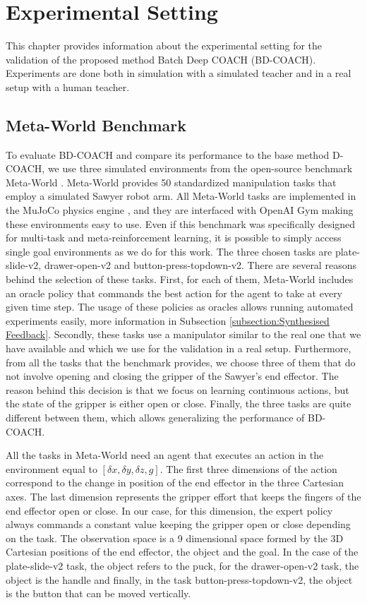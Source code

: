 \chapter{Experimental Setting}
\label{chapter:Experimental Setting}

This chapter provides information about the experimental setting for the validation of the proposed method Batch Deep COACH (BD-COACH). Experiments are done both in simulation with a simulated teacher and in a real setup with a human teacher.


\section{Meta-World Benchmark}
\label{section:Meta-World Benchmark}
To evaluate BD-COACH and compare its performance to the base method D-COACH, we use three simulated environments from the open-source benchmark Meta-World \cite{metaworld}. Meta-World 
provides 50 standardized manipulation tasks that employ a simulated Sawyer robot arm. All Meta-World tasks are implemented in the MuJoCo physics engine \cite{mujoco}, and they are interfaced with OpenAI Gym \cite{openai} making these environments easy to use. Even if this benchmark was specifically designed for multi-task and meta-reinforcement learning, it is possible to simply access single goal environments as we do for this work. 
The three chosen tasks are plate-slide-v2, drawer-open-v2 and button-press-topdown-v2. There are several reasons behind the selection of these tasks. First, for each of them, Meta-World includes an oracle policy that commands the best action for the agent to take at every given time step. The usage of these policies as oracles allows running automated experiments easily, more information in Subsection \ref{subsection:Synthesised Feedback}. Secondly, these tasks use a manipulator similar to the real one that we have available and which we use for the validation in a real setup. Furthermore, from all the tasks that the benchmark provides, we choose three of them that do not involve opening and closing the gripper of the Sawyer's end effector. The reason behind this decision is that we focus on learning continuous actions, but the state of the gripper is either open or close. Finally, the three tasks are quite different between them, which allows generalizing the performance of BD-COACH.

All the tasks in Meta-World need an agent that executes an action in the environment equal to $[\delta x, \delta y, \delta z, g]$. The first three dimensions of the action correspond to the change in position of the end effector in the three Cartesian axes. The last dimension represents the gripper effort that keeps the fingers of the end effector open or close. In our case, for this dimension, the expert policy always commands a constant value keeping the gripper open or close depending on the task.
The observation space is a 9 dimensional space formed by the 3D Cartesian positions of the end effector, the object and the goal. In the case of the plate-slide-v2 task, the object refers to the puck, for the drawer-open-v2 task, the object is the handle and finally, in the task button-press-topdown-v2, the object is the button that can be moved vertically.

